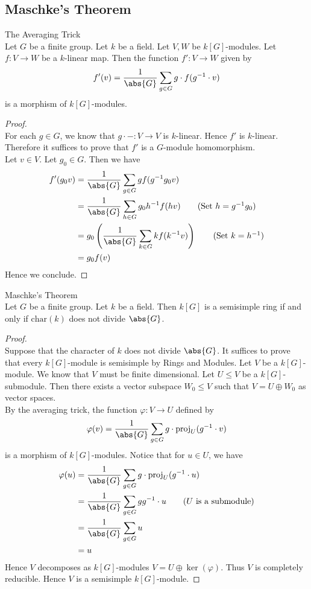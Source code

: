 \documentclass[a4paper]{article}
\begin{document}
\subsection{Maschke's Theorem}
\begin{lmm}{The Averaging Trick}{}\\
Let $G$ be a finite group. Let $k$ be a field. Let $V,W$ be $k[G]$-modules. Let $f:V\to W$ be a $k$-linear map. Then the function $f':V\to W$ given by $$f'(v)=\frac{1}{\abs{G}}\sum_{g\in G}g\cdot f(g^{-1}\cdot v)$$ is a morphism of $k[G]$-modules. 
\begin{proof}\\
For each $g\in G$, we know that $g\cdot -:V\to V$ is $k$-linear. Hence $f'$ is $k$-linear. Therefore it suffices to prove that $f'$ is a $G$-module homomorphism. \\

Let $v\in V$. Let $g_0\in G$. Then we have 
\begin{align*}
f'(g_0v)&=\frac{1}{\abs{G}}\sum_{g\in G}gf(g^{-1}g_0v)\\
&=\frac{1}{\abs{G}}\sum_{h\in G}g_0h^{-1}f(hv)\tag{Set $h=g^{-1}g_0$}\\
&=g_0\left(\frac{1}{\abs{G}}\sum_{k\in G}kf(k^{-1}v)\right)\tag{Set $k=h^{-1}$}\\
&=g_0f(v)
\end{align*}
Hence we conclude. 
\end{proof}
\end{lmm}

\begin{thm}{Maschke's Theorem}{}\\
Let $G$ be a finite group. Let $k$ be a field. Then $k[G]$ is a semisimple ring if and only if $\text{char}(k)$ does not divide $\abs{G}$. 
\begin{proof}\\
Suppose that the character of $k$ does not divide $\abs{G}$. It suffices to prove that every $k[G]$-module is semisimple by Rings and Modules. Let $V$ be a $k[G]$-module. We know that $V$ must be finite dimensional. Let $U\leq V$ be a $k[G]$-submodule. Then there exists a vector subspace $W_0\leq V$ such that $V=U\oplus W_0$ as vector spaces. \\

By the averaging trick, the function $\varphi:V\to U$ defined by $$\varphi(v)=\frac{1}{\abs{G}}\sum_{g\in G}g\cdot\text{proj}_U(g^{-1}\cdot v)$$ is a morphism of $k[G]$-modules. Notice that for $u\in U$, we have 
\begin{align*}
\varphi(u)&=\frac{1}{\abs{G}}\sum_{g\in G}g\cdot\text{proj}_U(g^{-1}\cdot u)\\
&=\frac{1}{\abs{G}}\sum_{g\in G}gg^{-1}\cdot u\tag{$U$ is a submodule}\\
&=\frac{1}{\abs{G}}\sum_{g\in G}u\\
&=u
\end{align*}
Hence $V$ decomposes as $k[G]$-modules $V=U\oplus\ker(\varphi)$. Thus $V$ is completely reducible. Hence $V$ is a semisimple $k[G]$-module. 
\end{proof}
\end{thm}
\end{document}
